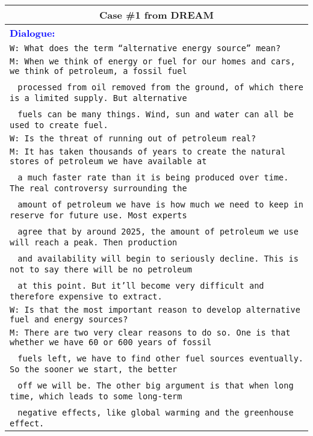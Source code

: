 \documentclass[11pt]{article}
\begin{document}
\begin{table*}[t]
        \centering
        \begin{adjustbox}{width=1.00\textwidth,center}
        \begin{tabular}{ | l | }
        \toprule
        \multicolumn{1}{|c|}{\textbf{Case \#1 from DREAM}} \\ \hline
        \textbf{\textcolor{blue}{Dialogue:}} \\ \hline

        \texttt{W: What does the term ``alternative energy source'' mean?} \\
        \texttt{M: When we think of energy or fuel for our homes and cars, we think of petroleum, a fossil fuel } \\
        \quad~ \texttt{processed from oil removed from the ground, of which there is a limited supply. But alternative} \\
        \quad~ \texttt{fuels can be many things. Wind, sun and water can all be used to create fuel.} \\
        \texttt{W: Is the threat of running out of petroleum real?} \\
        \texttt{M: It has taken thousands of years to create the natural stores of petroleum we have available at} \\
        \quad~ \texttt{a much faster rate than it is being produced over time. The real controversy surrounding the } \\
        \quad~ \texttt{amount of petroleum we have is how much we need to keep in reserve for future use. Most experts} \\
        \quad~ \texttt{agree that by around 2025, the amount of petroleum we use will reach a peak. Then production } \\
        \quad~ \texttt{and availability will begin to seriously decline. This is not to say there will be no petroleum } \\
        \quad~ \texttt{at this point. But it'll become very difficult and therefore expensive to extract.} \\
        \texttt{W: Is that the most important reason to develop alternative fuel and energy sources?} \\
        \texttt{M: There are two very clear reasons to do so. One is that whether we have 60 or 600 years of fossil} \\
        \quad~ \texttt{fuels left, we have to find other fuel sources eventually. So the sooner we start, the better } \\
        \quad~ \texttt{off we will be. The other big argument is that when long time, which leads to some long-term} \\
        \quad~ \texttt{negative effects, like global warming and the greenhouse effect.} \\


\end{tabular}
\end{adjustbox}
\end{table*}
\end{document}
